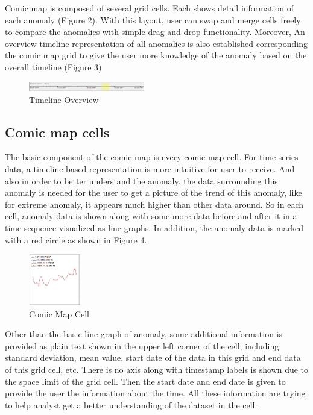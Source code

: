 \documentclass{vgtc}                          %
\begin{document}
Comic map is composed of several grid cells. Each shows detail information of each anomaly (Figure 2). With this layout, user can swap and merge cells freely to compare the anomalies with simple drag-and-drop functionality. Moreover, An overview timeline representation of all anomalies is also established corresponding the comic map grid to give the user more knowledge of the anomaly based on the overall timeline (Figure 3)

 \begin{figure}[htb]
	\centering
  \includegraphics[width=0.45\textwidth]{timeline.png}
  \caption{Timeline Overview}
\end{figure}

\subsection{Comic map cells}

The basic component of the comic map is every comic map cell. For time series data, a timeline-based representation is more intuitive for user to receive. And also in order to better understand the anomaly, the data surrounding this anomaly is needed for the user to get a picture of the trend of this anomaly, like for extreme anomaly, it appears much higher than other data around. So in each cell, anomaly data is shown along with some more data before and after it in a time sequence visualized as line graphs. In addition, the anomaly data is marked with a red circle as shown in Figure 4. 

 \begin{figure}[htb]
	\centering
  \includegraphics[width=0.20\textwidth]{onecell.jpg}
  \caption{Comic Map Cell}
\end{figure}

Other than the basic line graph of anomaly, some additional information is provided as plain text shown in the upper left corner of the cell, including standard deviation, mean value, start date of the data in this grid and end data of this grid cell, etc. There is no axis along with timestamp labels is shown due to the space limit of the grid cell. Then the start date and end date is given to provide the user the information about the time. All these information are trying to help analyst get a better understanding of the dataset in the cell.
\end{document}
